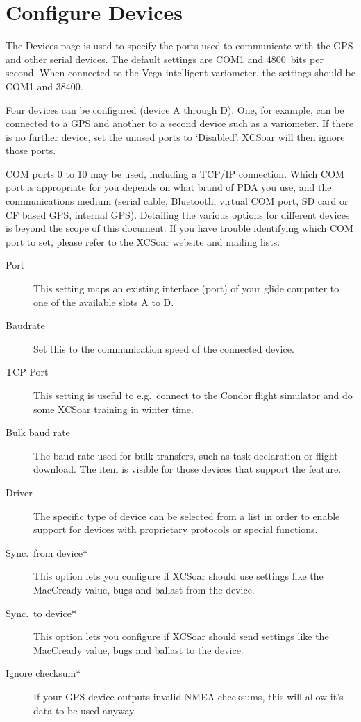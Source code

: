 \section{Configure Devices} \label{conf:comdevices}

The Devices page is used to specify the ports used to communicate with
the GPS and other serial devices. The default settings are COM1 and
4800~bits per second.  When connected to the Vega intelligent
variometer, the settings should be COM1 and 38400.

Four devices can be configured (device A through D). One, for
example, can be connected to a GPS and another to a
second device such as a variometer.  If there is no further device, 
set the unused ports to `Disabled'.  XCSoar will then ignore those ports.

COM ports 0 to 10 may be used, including a TCP/IP connection.  
Which COM port is appropriate for you
depends on what brand of PDA you use, and the communications medium
(serial cable, Bluetooth, virtual COM port, SD card or CF based GPS,
internal GPS).  Detailing the various options for different devices is
beyond the scope of this document.  If you have trouble identifying
which COM port to set, please refer to the XCSoar website and mailing
lists.

\begin{description}
\item[Port]  This setting maps an existing interface (port) of your 
  glide computer to one of the available slots A to D.
\item[Baudrate]  Set this to the communication speed of the connected device.
\item[TCP Port]  This setting is useful to e.g.\ connect to the Condor flight
  simulator and do some XCSoar training in winter time.
\item[Bulk baud rate]  The baud rate used for bulk transfers, such 
  as task declaration or flight download. The item is visible for those 
  devices that support the feature.
\item[Driver]  The specific type of device can be selected from a list in order
  to enable support for devices with proprietary protocols or special
  functions.
\item[Sync.\ from device*]  This option lets you configure if XCSoar should use settings
  like the MacCready value, bugs and ballast from the device.
\item[Sync.\ to device*]  This option lets you configure if XCSoar should send settings
  like the MacCready value, bugs and ballast to the device.
\item[Ignore checksum*] If your GPS device outputs invalid NMEA checksums, this 
  will allow it's data to be used anyway.
\end{description}
